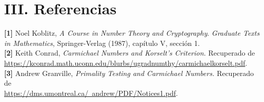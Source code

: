 \documentclass{article}
\theoremstyle{definition}
\begin{document}
\section*{III. Referencias}
\textbf{[1]} Noel Koblitz, \textit{A Course in Number Theory and Cryptography}. \textit{Graduate Texts in Mathematics}, Springer-Verlag (1987), capítulo V, sección 1.\\

\textbf{[2]} Keith Conrad, \textit{Carmichael Numbers and Korselt's Criterion.} Recuperado de \\ \href{https://kconrad.math.uconn.edu/blurbs/ugradnumthy/carmichaelkorselt.pdf}{https://kconrad.math.uconn.edu/blurbs/ugradnumthy/carmichaelkorselt.pdf}.\\

\textbf{[3]} Andrew Granville, \textit{Primality Testing and Carmichael Numbers.}  Recuperado de  \\
\href{https://dms.umontreal.ca/~andrew/PDF/Notices1.pdf}{https://dms.umontreal.ca/~andrew/PDF/Notices1.pdf}.
\end{document}
